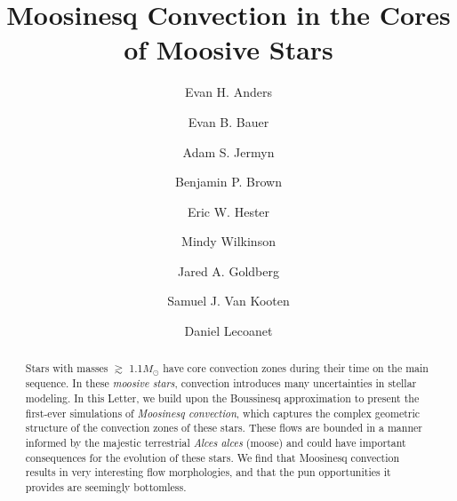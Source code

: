 \documentclass[onecolumn, twocolappendix]{aastex631}
\begin{document}
\title{Moosinesq Convection in the Cores of Moosive Stars}
\author[0000-0002-3433-4733]{Evan H. Anders}
\author[0000-0002-4791-6724]{Evan B. Bauer}
\author[0000-0001-5048-9973]{Adam S. Jermyn}
\author[0000-0001-8935-219X]{Benjamin P. Brown}
\author[0000-0003-1651-9141]{Eric W. Hester}
\author{Mindy Wilkinson}
\author[0000-0003-1012-3031]{Jared A. Goldberg}
\author[0000-0002-4472-8517]{Samuel J. Van Kooten}
\author[0000-0002-7635-9728]{Daniel Lecoanet}


\begin{abstract}
    Stars with masses $\gtrsim$ 1.1$M_\odot$ have core convection zones during their time on the main sequence.
    In these \emph{moosive stars}, convection introduces many uncertainties in stellar modeling.
    In this Letter, we build upon the Boussinesq approximation to present the first-ever simulations of \emph{Moosinesq convection}, which captures the complex geometric structure of the convection zones of these stars.
    These flows are bounded in a manner informed by the majestic terrestrial \emph{Alces alces} (moose) and could have important consequences for the evolution of these stars.
    We find that Moosinesq convection results in very interesting flow morphologies, and that the pun opportunities it provides are seemingly bottomless.
\end{abstract}


\end{document}
